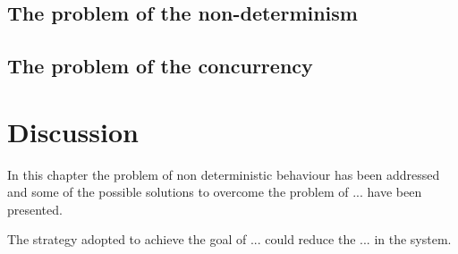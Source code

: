 \subsection{The problem of the non-determinism} %


\subsection{The problem of the concurrency} %




\section{Discussion}
In this chapter the problem of non deterministic behaviour has been addressed and some of the possible solutions to overcome the problem of ...  have been presented.

The strategy adopted to achieve the goal of ... could reduce the ... in the system.


\clearpage
\thispagestyle{empty}